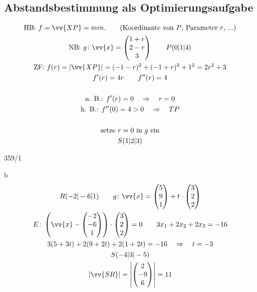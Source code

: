 \subsection{Abstandsbestimmung als Optimierungsaufgabe}
\begin{gather*}
  \text{HB: } f = \vv{XP} = min. \qquad\text{(Koordinante von $P$, Parameter $r$, ...)} \\
  \text{NB: } g \colon \vv{x} = \begin{pmatrix}1 + r \\ 2 - r \\ 3\end{pmatrix} \qquad P(0|1|4) \\
  \text{ZF: } f(r) = |\vv{XP}| = (-1 - r)^2 + (-1 + r)^2 + 1^2 = 2r^2 + 3 \\
  f'(r) = 4r \qquad f''(r) = 4 \\\\
  \text{n. B.: } f'(r) = 0 \quad\Rightarrow\quad r = 0 \\
  \text{h. B.: } f''(0) = 4 > 0 \quad\Rightarrow\quad TP \\\\
  \text{setze $r = 0$ in $g$ ein} \\
  S(1|2|3)
\end{gather*}
\begin{exercise}{359/1}
  \item [b]
  \begin{gather*}
    R(-2|-6|1) \qquad g \colon \vv{x} = \begin{pmatrix}5 \\ 9 \\ 1\end{pmatrix} + t \cdot \begin{pmatrix}3 \\ 2 \\ 2\end{pmatrix} \\
    E \colon \left(\vv{x} - \begin{pmatrix}-2 \\ -6 \\ 1\end{pmatrix}\right) \cdot \begin{pmatrix}3 \\ 2 \\ 2\end{pmatrix} = 0 \qquad 3x_1 + 2x_2 + 2x_3 = -16 \\
    3(5 + 3t) + 2(9 + 2t) + 2(1 + 2t) = -16 \quad\Rightarrow\quad t = -3 \\
    S(-4|3|-5) \\
    |\vv{SR}| = \left|\begin{pmatrix}2 \\ -9 \\ 6\end{pmatrix}\right| = 11
  \end{gather*}
\end{exercise}
